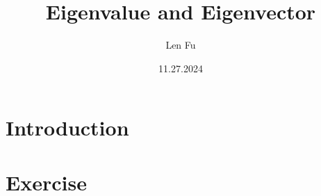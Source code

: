 \documentclass{article}
\title{Eigenvalue and Eigenvector}
\author{Len Fu}
\date{11.27.2024}
\theoremstyle{definition}
\newtheorem{exe}{Exercise}
\begin{document}
\maketitle

\tableofcontents

\newpage




\section{Introduction}




\newpage
\section{Exercise}
\end{document}
